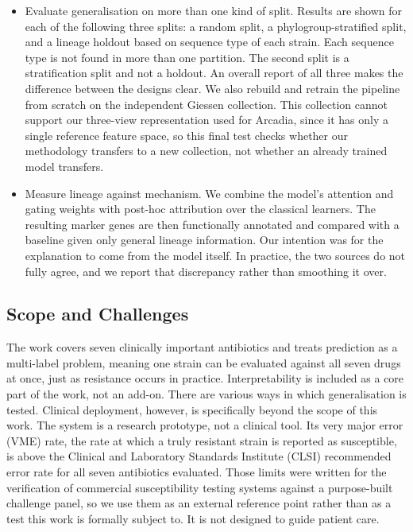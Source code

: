 \documentclass[journal]{IEEEtran}
\begin{document}
\begin{itemize}
\item Evaluate generalisation on more than one kind of split. Results are shown for
each of the following three splits: a random split, a phylogroup-stratified split,
and a lineage holdout based on sequence type of each strain. Each sequence type is
not found in more than one partition. The second split is a stratification split
and not a holdout. An overall report of all three makes the difference between the
designs clear. We also rebuild and retrain the pipeline from scratch on the
independent Giessen collection. This collection cannot support our three-view
representation used for Arcadia, since it has only a single reference feature
space, so this final test checks whether our methodology transfers to a new
collection, not whether an already trained model transfers.

\item Measure lineage against mechanism. We combine the model's attention and
gating weights with post-hoc attribution over the classical learners. The
resulting marker genes are then functionally annotated and compared with a baseline
given only general lineage information. Our intention was for the explanation to
come from the model itself. In practice, the two sources do not fully agree, and we
report that discrepancy rather than smoothing it over.
\end{itemize}

\subsection{Scope and Challenges}

The work covers seven clinically important antibiotics and treats prediction as a
multi-label problem, meaning one strain can be evaluated against all seven drugs at
once, just as resistance occurs in practice. Interpretability is included as a core
part of the work, not an add-on. There are various ways in which generalisation is
tested. Clinical deployment, however, is specifically beyond the scope of this
work. The system is a research prototype, not a clinical tool. Its very major error
(VME) rate, the rate at which a truly resistant strain is reported as susceptible,
is above the Clinical and Laboratory Standards Institute (CLSI) recommended error
rate \cite{clsi_m52} for all seven antibiotics evaluated. Those limits were written
for the verification of commercial susceptibility testing systems against a
purpose-built challenge panel, so we use them as an external reference point rather
than as a test this work is formally subject to. It is not designed to guide patient
care.
\end{document}
